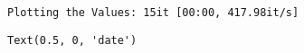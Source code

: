 \documentclass[11pt]{article}
\makeatletter
\newcommand{\boxspacing}{\kern\kvtcb@left@rule\kern\kvtcb@boxsep}
\newcommand{\prompt}[4]{
        {\ttfamily\llap{{\color{#2}[#3]:\hspace{3pt}#4}}\vspace{-\baselineskip}}
    }
\makeatother
\begin{document}
    \begin{Verbatim}[commandchars=\\\{\}]
Plotting the Values: 15it [00:00, 417.98it/s]
    \end{Verbatim}

            \begin{tcolorbox}[breakable, size=fbox, boxrule=.5pt, pad at break*=1mm, opacityfill=0]
\prompt{Out}{outcolor}{60}{\boxspacing}
\begin{Verbatim}[commandchars=\\\{\}]
Text(0.5, 0, 'date')
\end{Verbatim}
\end{tcolorbox}
        
    \begin{center}
    \end{center}
    { \hspace*{\fill} \\}
    
\end{document}
